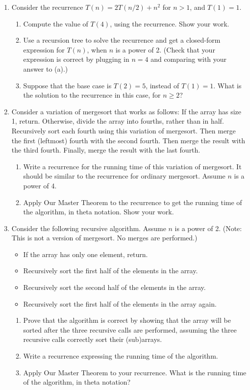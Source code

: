 \documentclass{article}
\begin{document}
\begin{enumerate}
    \item Consider the recurrence $T(n) = 2T(n/2) + n^2$ for $n > 1$, and $T(1) = 1$.
    \begin{enumerate}
        \item Compute the value of $T(4)$, using the recurrence. Show your work.
        \item Use a recursion tree to solve the recurrence and get a closed-form expression for $T(n)$, when $n$ is a power of 2. (Check that your expression is correct by plugging in $n = 4$ and comparing with your answer to (a).)
        \item Suppose that the base case is $T(2) = 5$, instead of $T(1) = 1$. What is the solution to the recurrence in this case, for $n \geq 2$?
    \end{enumerate}

    \item Consider a variation of mergesort that works as follows: If the array has size 1, return. Otherwise, divide the array into fourths, rather than in half. Recursively sort each fourth using this variation of mergesort. Then merge the first (leftmost) fourth with the second fourth. Then merge the result with the third fourth. Finally, merge the result with the last fourth.
    \begin{enumerate}
        \item Write a recurrence for the running time of this variation of mergesort. It should be similar to the recurrence for ordinary mergesort. Assume $n$ is a power of 4.
        \item Apply Our Master Theorem to the recurrence to get the running time of the algorithm, in theta notation. Show your work.
    \end{enumerate}

    \item Consider the following recursive algorithm. Assume $n$ is a power of 2. (Note: This is not a version of mergesort. No merges are performed.)
    \begin{itemize}
        \item If the array has only one element, return.
        \item Recursively sort the first half of the elements in the array.
        \item Recursively sort the second half of the elements in the array.
        \item Recursively sort the first half of the elements in the array again.
    \end{itemize}
    \begin{enumerate}
        \item  Prove that the algorithm is correct by showing that the array will be sorted after the three recursive calls are performed, assuming the three recursive calls correctly sort their (sub)arrays.
        \item Write a recurrence expressing the running time of the algorithm.
        \item Apply Our Master Theorem to your recurrence. What is the running time of the algorithm, in theta notation?
    \end{enumerate}


\end{enumerate}
\end{document}
